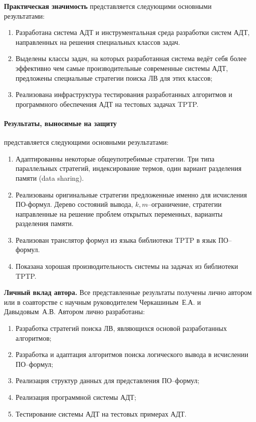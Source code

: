 \documentclass[a4paper]{report}
\begin{document}
\textbf{Практическая значимость} представляется следующими основными результатами:
\begin{enumerate}
\item Разработана система АДТ и инструментальная среда разработки систем АДТ, направленных на решения специальных классов задач.
\item Выделены классы задач, на которых разработанная система ведёт себя более эффективно чем самые производительные современные системы АДТ, предложены специальные стратегии поиска ЛВ для этих классов;
\item Реализована инфраструктура тестирования разработанных алгоритмов и программного обеспечения АДТ на тестовых задачах TPTP.
\end{enumerate}


\paragraph{Результаты, выносимые на защиту}\hspace{-1em} представляется следующими основными результатами:
\begin{enumerate}
\item Адаптированны некоторые общеупотребимые стратегии. Три типа параллельных стратегий, индексирование термов, один вариант разделения памяти (data sharing).
\item Реализованы оригинальные стратегии предложенные именно для исчисления ПО-формул. Дерево состояний вывода, $k,m$--ограничение, стратегии направленные на решение проблем открытых переменных, варианты разделения памяти.
\item Реализован транслятор формул из языка библиотеки TPTP в язык ПО--формул.
\item Показана хорошая производительность системы на задачах из библиотеки TPTP.
\end{enumerate}

\textbf{Личный вклад автора.}
Все представленные результаты получены лично автором или в соавторстве с научным руководителем Черкашиным~Е.А. и Давыдовым~А.В. Автором лично разработаны:
\begin{enumerate}
\item Разработка стратегий поиска ЛВ, являющихся основой разработанных алгоритмов;
\item Разработка и адаптация алгоритмов поиска логического вывода в исчислении ПО--формул;
\item Реализация структур данных для представления ПО--формул;
\item Реализация программной системы АДТ;
\item Тестирование системы АДТ на тестовых примерах АДТ.
\end{enumerate}
\end{document}
